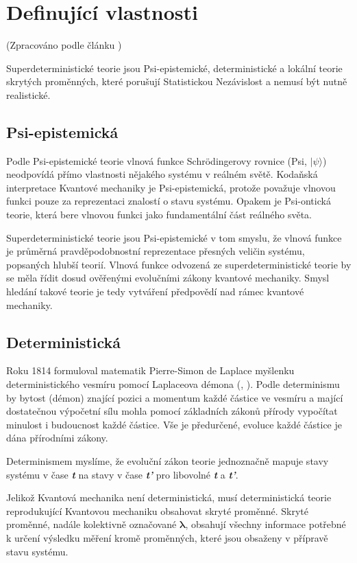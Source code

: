 \section{Definující vlastnosti}
(Zpracováno podle článku \cite{supdet:rethink})

Superdeterministické teorie jsou Psi-epistemické, deterministické a lokální teorie skrytých proměnných, které porušují Statistickou Nezávislost a nemusí být nutně realistické.

\subsection{Psi-epistemická}
Podle Psi-epistemické teorie vlnová funkce Schrödingerovy rovnice (Psi, $|\psi\rangle$) neodpovídá přímo vlastnosti nějakého systému v reálném světě. Kodaňská interpretace Kvantové mechaniky je Psi-epistemická, protože považuje vlnovou funkci pouze za reprezentaci znalostí o stavu systému. Opakem je Psi-ontická teorie, která bere vlnovou funkci jako fundamentální část reálného světa.

Superdeterministické teorie jsou Psi-epistemické v tom smyslu, že vlnová funkce je průměrná pravděpodobnostní reprezentace přesných veličin systému, popsaných hlubší teorií. Vlnová funkce odvozená ze superdeterministické teorie by se měla řídit dosud ověřenými evolučními zákony kvantové mechaniky. Smysl hledání takové teorie je tedy vytváření předpovědí nad rámec kvantové mechaniky.

\subsection{Deterministická}
Roku 1814 formuloval matematik Pierre-Simon de Laplace myšlenku deterministického vesmíru pomocí Laplaceova démona (, \cite*{laplace:demon}). Podle determinismu by bytost (démon) znající pozici a momentum každé částice ve vesmíru a mající dostatečnou výpočetní sílu mohla pomocí základních zákonů přírody vypočítat minulost i budoucnost každé částice. Vše je předurčené, evoluce každé částice je dána přírodními zákony.

Determinismem myslíme, že evoluční zákon teorie jednoznačně mapuje stavy systému v čase \textbf{\emph{t}} na stavy v čase \textbf{\emph{t'}} pro libovolné \textbf{\emph{t}} a \textbf{\emph{t'}}.

Jelikož Kvantová mechanika není deterministická, musí deterministická teorie reprodukující Kvantovou mechaniku obsahovat skryté proměnné. Skryté proměnné, nadále kolektivně označované $\bm{\lambda}$, obsahují všechny informace potřebné k určení výsledku měření kromě  proměnných, které jsou obsaženy v přípravě stavu systému.

